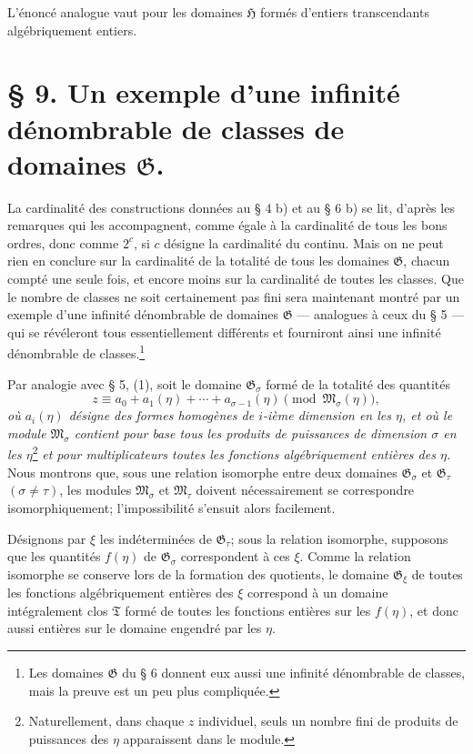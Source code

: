 L'énoncé analogue vaut pour les domaines $\mathfrak H$ formés d'entiers transcendants algébriquement entiers.

\section*{\S{} 9. Un exemple d'une infinité dénombrable de classes de domaines $\mathfrak G$.}

La cardinalité des constructions données au \S{} 4 b) et au \S{} 6 b) se lit, d'après les remarques qui les accompagnent, comme égale à la cardinalité de tous les bons ordres, donc comme $2^c$, si $c$ désigne la cardinalité du continu. Mais on ne peut rien en conclure sur la cardinalité de la totalité de tous les domaines $\mathfrak G$, chacun compté une seule fois, et encore moins sur la cardinalité de toutes les classes. Que le nombre de classes ne soit certainement pas fini sera maintenant montré par un exemple d'une infinité dénombrable de domaines $\mathfrak G$ --- analogues à ceux du \S{} 5 --- qui se révéleront tous essentiellement différents et fourniront ainsi une infinité dénombrable de classes.\footnote{Les domaines $\mathfrak G$ du \S{} 6 donnent eux aussi une infinité dénombrable de classes, mais la preuve est un peu plus compliquée.}

Par analogie avec \S{} 5, (1), soit le domaine $\mathfrak G_\sigma$ formé de la totalité des quantités
\begin{equation}
 z\equiv a_0+a_1(\eta)+\cdots+a_{\sigma-1}(\eta)
 \pmod{\mathfrak M_\sigma(\eta)},
\tag{1}
\end{equation}
\emph{où $a_i(\eta)$ désigne des formes homogènes de $i$-ième dimension en les $\eta$, et où le module $\mathfrak M_\sigma$ contient pour base tous les produits de puissances de dimension $\sigma$ en les $\eta$}\footnote{Naturellement, dans chaque $z$ individuel, seuls un nombre fini de produits de puissances des $\eta$ apparaissent dans le module.} \emph{et pour multiplicateurs toutes les fonctions algébriquement entières des $\eta$.} Nous montrons que, sous une relation isomorphe entre deux domaines $\mathfrak G_\sigma$ et $\mathfrak G_\tau$ $(\sigma\ne\tau)$, les modules $\mathfrak M_\sigma$ et $\mathfrak M_\tau$ doivent nécessairement se correspondre isomorphiquement; l'impossibilité s'ensuit alors facilement.

Désignons par $\xi$ les indéterminées de $\mathfrak G_\tau$; sous la relation isomorphe, supposons que les quantités $f(\eta)$ de $\mathfrak G_\sigma$ correspondent à ces $\xi$. Comme la relation isomorphe se conserve lors de la formation des quotients, le domaine $\mathfrak G_\xi$ de toutes les fonctions algébriquement entières des $\xi$ correspond à un domaine intégralement clos $\mathfrak T$ formé de toutes les fonctions entières sur les $f(\eta)$, et donc aussi entières sur le domaine engendré par les $\eta$.

